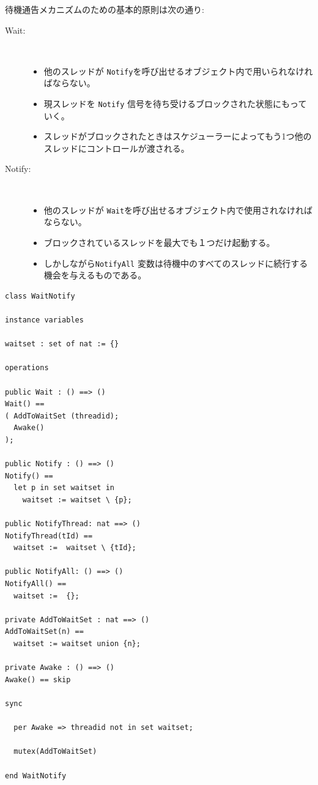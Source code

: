 \documentclass[\pformat,12pt]{jreport}
\begin{document}
待機通告メカニズムのための基本的原則は次の通り:

\begin{description}
\item[Wait:]\mbox{}\\
            \begin{itemize}
            \item 他のスレッドが \texttt{Notify}を呼び出せるオブジェクト内で用いられなければならない。
            \item 現スレッドを \texttt{Notify} 信号を待ち受けるブロックされた状態にもっていく。
            \item スレッドがブロックされたときはスケジューラーによってもう1つ他のスレッドにコントロールが渡される。
            \end{itemize}
\item[Notify:]\mbox{}\\
  \begin{itemize}
  \item 他のスレッドが \texttt{Wait}を呼び出せるオブジェクト内で使用されなければならない。
  \item ブロックされているスレッドを最大でも１つだけ起動する。
  \item しかしながら\texttt{NotifyAll} 変数は待機中のすべてのスレッドに続行する機会を与えるものである。
  \end{itemize}
\end{description}

\begin{lstlisting}
class WaitNotify

instance variables

waitset : set of nat := {}

operations

public Wait : () ==> ()
Wait() ==
( AddToWaitSet (threadid);
  Awake()
);

public Notify : () ==> ()
Notify() ==
  let p in set waitset in
    waitset := waitset \ {p};

public NotifyThread: nat ==> ()
NotifyThread(tId) ==
  waitset :=  waitset \ {tId};

public NotifyAll: () ==> ()
NotifyAll() ==
  waitset :=  {};

private AddToWaitSet : nat ==> ()
AddToWaitSet(n) ==
  waitset := waitset union {n};

private Awake : () ==> ()
Awake() == skip

sync

  per Awake => threadid not in set waitset;

  mutex(AddToWaitSet)

end WaitNotify
\end{lstlisting}
\end{document}
